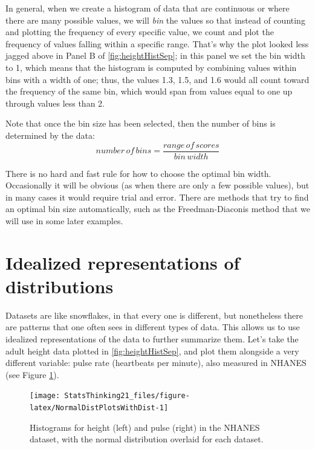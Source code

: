 \documentclass[12pt,]{book}
\theoremstyle{definition}
\theoremstyle{definition}
\theoremstyle{definition}
\theoremstyle{remark}
\begin{document}
In general, when we create a histogram of data that are continuous or where there are many possible values, we will \emph{bin} the values so that instead of counting and plotting the frequency of every specific value, we count and plot the frequency of values falling within a specific range. That's why the plot looked less jagged above in Panel B of \ref{fig:heightHistSep}; in this panel we set the bin width to 1, which means that the histogram is computed by combining values within bins with a width of one; thus, the values 1.3, 1.5, and 1.6 would all count toward the frequency of the same bin, which would span from values equal to one up through values less than 2.

Note that once the bin size has been selected, then the number of bins is determined by the data:
\[
number\, of\, bins  = \frac{range\, of\, scores}{bin\, width}
\]

There is no hard and fast rule for how to choose the optimal bin width. Occasionally it will be obvious (as when there are only a few possible values), but in many cases it would require trial and error. There are methods that try to find an optimal bin size automatically, such as the Freedman-Diaconis method that we will use in some later examples.

\hypertarget{idealized-representations-of-distributions}{%
\section{Idealized representations of distributions}\label{idealized-representations-of-distributions}}

Datasets are like snowflakes, in that every one is different, but nonetheless there are patterns that one often sees in different types of data. This allows us to use idealized representations of the data to further summarize them. Let's take the adult height data plotted in \ref{fig:heightHistSep}, and plot them alongside a very different variable: pulse rate (heartbeats per minute), also measured in NHANES (see Figure \ref{fig:NormalDistPlotsWithDist}).

\begin{figure}
\texttt{[image: StatsThinking21\_files/figure-latex/NormalDistPlotsWithDist-1]} \caption{Histograms for height (left) and pulse (right) in the NHANES dataset, with the normal distribution overlaid for each dataset.}\label{fig:NormalDistPlotsWithDist}
\end{figure}
\end{document}
